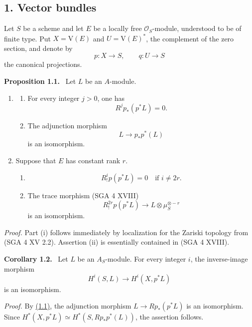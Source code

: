 \documentclass[11pt]{article}
\newenvironment{statement}[1]{\par\medskip\noindent\textbf{#1.}\ }{\par\medskip}
\providecommand{\V}{\mathrm V}
\begin{document}
\subsection*{1. Vector bundles}\label{sga5:VII:subsection:1}

Let $S$ be a scheme and let $E$ be a locally free $\mathcal O_S$-module, understood to be of finite type. Put $X=\V(E)$ and $U=\V(E)^*$, the complement of the zero section, and denote by
\[
p:X\to S,
\qquad
q:U\to S
\]
the canonical projections.

\label{sga5:VII:proposition:1.1}\begin{statement}{Proposition 1.1}
Let $L$ be an $A$-module.
\begin{enumerate}[label=(\roman*)]
\item
\begin{enumerate}[label=\alph*)]
\item For every integer $j>0$, one has
\[
R^j p_*(p^*L)=0.
\]
\item The adjunction morphism
\[
L\longrightarrow p_*p^*(L)
\]
is an isomorphism.
\end{enumerate}
\item Suppose that $E$ has constant rank $r$.
\begin{enumerate}[label=\alph*)]
\item
\[
R_!^i p(p^*L)=0\quad\text{if }i\ne 2r.
\]
\item The trace morphism (SGA 4 XVIII)
\[
R_!^{2r}p(p^*L)\longrightarrow L\otimes\mu_S^{\otimes -r}
\]
is an isomorphism.
\end{enumerate}
\end{enumerate}
\end{statement}

\emph{Proof.} Part (i) follows immediately by localization for the Zariski topology from (SGA 4 XV 2.2). Assertion (ii) is essentially contained in (SGA 4 XVIII).

\label{sga5:VII:corollary:1.2}\begin{statement}{Corollary 1.2}
Let $L$ be an $A_S$-module. For every integer $i$, the inverse-image morphism
\[
H^i(S,L)\longrightarrow H^i(X,p^*L)
\]
is an isomorphism.
\end{statement}

\emph{Proof.} By \hyperref[sga5:VII:proposition:1.1]{(1.1)}, the adjunction morphism $L\to Rp_*(p^*L)$ is an isomorphism. Since $H^*(X,p^*L)\simeq H^*(S,Rp_*p^*(L))$, the assertion follows.
\end{document}
